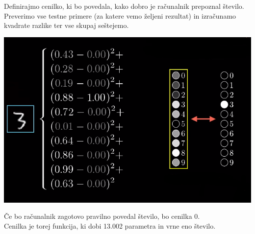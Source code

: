 \documentclass{beamer}
\begin{document}
\begin{frame}{}
Definirajmo cenilko, ki bo povedala, kako dobro je računalnik prepoznal število.\\
\smallskip
Preverimo vse testne primere (za katere vemo željeni rezultat) in izračunamo kvadrate razlike ter vse skupaj seštejemo.
\smallskip
\begin{center}
\includegraphics[scale = 0.35]{photo/2foto3} \\
\end{center}
\smallskip
Če bo računalnik zagotovo pravilno povedal število, bo cenilka 0. \\
\smallskip
Cenilka je torej funkcija, ki dobi 13.002 parametra in vrne eno število.
\end{frame}
 
\end{document}
